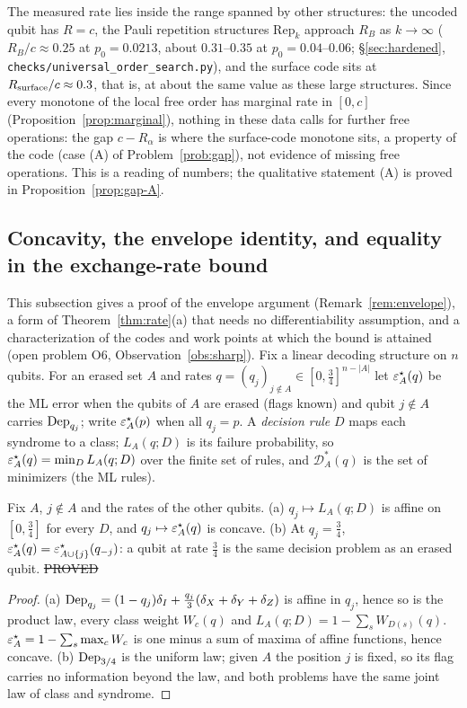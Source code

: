 \begin{remark}\label{rem:gap-m2}
The measured rate lies inside the range spanned by other structures: the uncoded qubit has $R=c$, the Pauli repetition structures $\mathrm{Rep}_k$ approach $R_B$ as $k\to\infty$ ($R_B/c\approx0.25$ at $p_0=0.0213$, about $0.31$--$0.35$ at $p_0=0.04$--$0.06$; \S\ref{sec:hardened}, \texttt{checks/universal\_order\_search.py}), and the surface code sits at $R_{\rm surface}/c\approx0.3$, that is, at about the same value as these large structures.
Since every monotone of the local free order has marginal rate in $[0,c]$ (Proposition~\ref{prop:marginal}), nothing in these data calls for further free operations: the gap $c-R_\alpha$ is where the surface-code monotone sits, a property of the code (case (A) of Problem~\ref{prob:gap}), not evidence of missing free operations. This is a reading of numbers; the qualitative statement (A) is proved in Proposition~\ref{prop:gap-A}.
\end{remark}

\subsection{Concavity, the envelope identity, and equality in the exchange-rate bound}\label{sec:equality}

This subsection gives a proof of the envelope argument (Remark~\ref{rem:envelope}), a form of Theorem~\ref{thm:rate}(a) that needs no differentiability assumption, and a characterization of the codes and work points at which the bound is attained (open problem O6, Observation~\ref{obs:sharp}).
Fix a linear decoding structure on $n$ qubits. For an erased set $A$ and rates $q=(q_j)_{j\notin A}\in[0,\tfrac34]^{n-|A|}$ let $\varepsilon^{\star}_A(q)$ be the ML error when the qubits of $A$ are erased (flags known) and qubit $j\notin A$ carries $\mathrm{Dep}_{q_j}$; write $\varepsilon^{\star}_A(p)$ when all $q_j=p$.
A \emph{decision rule} $D$ maps each syndrome to a class; $L_A(q;D)$ is its failure probability, so $\varepsilon^{\star}_A(q)=\min_DL_A(q;D)$ over the finite set of rules, and $\mathcal D^\ast_A(q)$ is the set of minimizers (the ML rules).

\begin{lemma}\label{lem:concave}
Fix $A$, $j\notin A$ and the rates of the other qubits.
(a) $q_j\mapsto L_A(q;D)$ is affine on $[0,\tfrac34]$ for every $D$, and $q_j\mapsto\varepsilon^{\star}_A(q)$ is concave.
(b) At $q_j=\tfrac34$, $\varepsilon^{\star}_A(q)=\varepsilon^{\star}_{A\cup\{j\}}(q_{-j})$: a qubit at rate $\tfrac34$ is the same decision problem as an erased qubit.
\hfill\st{PROVED}
\end{lemma}
\begin{proof}
(a) $\mathrm{Dep}_{q_j}=(1-q_j)\delta_I+\tfrac{q_j}3(\delta_X+\delta_Y+\delta_Z)$ is affine in $q_j$, hence so is the product law, every class weight $W_c(q)$ and $L_A(q;D)=1-\sum_sW_{D(s)}(q)$.
$\varepsilon^{\star}_A=1-\sum_s\max_cW_c$ is one minus a sum of maxima of affine functions, hence concave. (b) $\mathrm{Dep}_{3/4}$ is the uniform law; given $A$ the position $j$ is fixed, so its flag carries no information beyond the law, and both problems have the same joint law of class and syndrome.
\end{proof}

